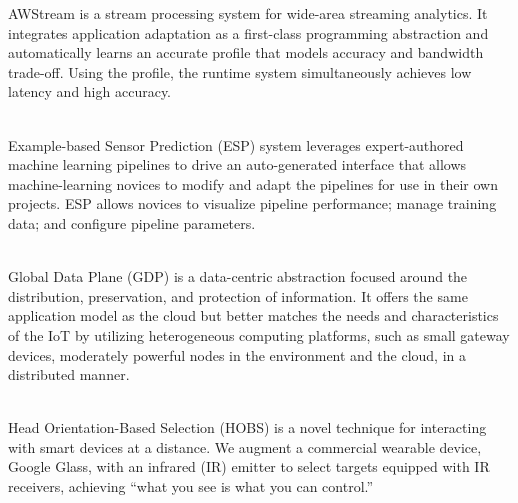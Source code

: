 
\begin{cvskills}

   {AWStream is a stream processing system for wide-area
    streaming analytics. It integrates application adaptation as a first-class
    programming abstraction and automatically learns an accurate profile that
    models accuracy and bandwidth trade-off. Using the profile, the runtime
    system simultaneously achieves low latency and high accuracy.}

  \\[-1em]
  
   {Example-based Sensor Prediction (ESP) system leverages
    expert-authored machine learning pipelines to drive an auto-generated
    interface that allows machine-learning novices to modify and adapt the
    pipelines for use in their own projects. ESP allows novices to visualize
    pipeline performance; manage training data; and configure pipeline
    parameters.}
  
  \\[-1em]

   {Global Data Plane (GDP) is a data-centric abstraction focused
    around the distribution, preservation, and protection of information. It
    offers the same application model as the cloud but better matches the needs
    and characteristics of the IoT by utilizing heterogeneous computing
    platforms, such as small gateway devices, moderately powerful nodes in the
    environment and the cloud, in a distributed manner.}

  \\[-1em]

   {Head Orientation-Based Selection (HOBS) is a novel technique
    for interacting with smart devices at a distance. We augment a commercial
    wearable device, Google Glass, with an infrared (IR) emitter to select
    targets equipped with IR receivers, achieving ``what you see is what you can
    control.''}

\end{cvskills}

